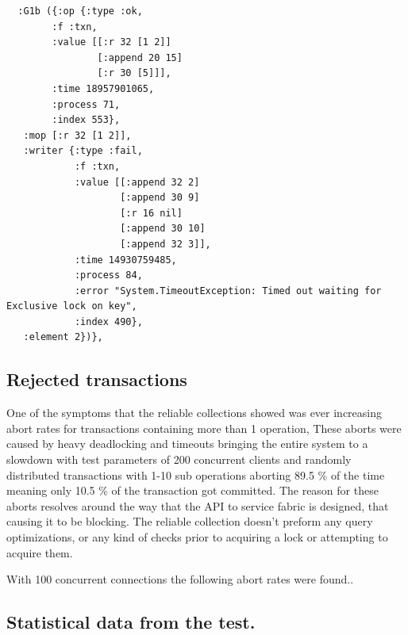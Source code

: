 \documentclass[a4paper,10pt,titlepage]{report}
\begin{document}
\begin{lstlisting}
  :G1b ({:op {:type :ok,
        :f :txn,
        :value [[:r 32 [1 2]] 
                [:append 20 15] 
                [:r 30 [5]]],
        :time 18957901065,
        :process 71,
        :index 553},
   :mop [:r 32 [1 2]],
   :writer {:type :fail,
            :f :txn,
            :value [[:append 32 2] 
                    [:append 30 9] 
                    [:r 16 nil] 
                    [:append 30 10] 
                    [:append 32 3]],
            :time 14930759485,
            :process 84,
            :error "System.TimeoutException: Timed out waiting for Exclusive lock on key",
            :index 490},
   :element 2})},
\end{lstlisting}

\newpage
\subsection{Rejected transactions}

One of the symptoms that the reliable collections showed was ever increasing abort rates for transactions containing more than 1 operation, These aborts were caused by heavy deadlocking and timeouts bringing the entire system to a slowdown with test parameters of 200 concurrent clients and randomly distributed transactions with 1-10 sub operations aborting 89.5 \% of the time meaning only 10.5 \% of the transaction got committed. The reason for these aborts resolves around the way that the API to service fabric is designed, that causing it to be blocking. The reliable collection doesn't preform any query optimizations, or any kind of checks prior to acquiring a lock or attempting to acquire them. 

With 100 concurrent connections the following abort rates were found.. 


\newpage                      
\subsection{Statistical data from the test.}
\end{document}
